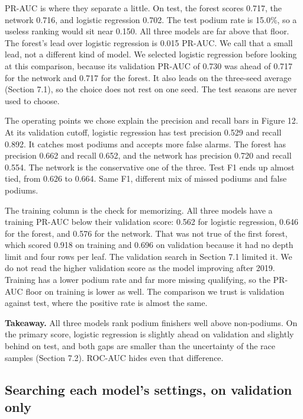 \documentclass[10pt,a4paper]{article}
\begin{document}
PR-AUC is where they separate a little. On test, the forest scores 0.717, the network 0.716, and logistic regression 0.702. The test podium rate is 15.0\%, so a useless ranking would sit near 0.150. All three models are far above that floor. The forest's lead over logistic regression is 0.015 PR-AUC. We call that a small lead, not a different kind of model. We selected logistic regression before looking at this comparison, because its validation PR-AUC of 0.730 was ahead of 0.717 for the network and 0.717 for the forest. It also leads on the three-seed average (Section 7.1), so the choice does not rest on one seed. The test seasons are never used to choose.


The operating points we chose explain the precision and recall bars in Figure 12. At its validation cutoff, logistic regression has test precision 0.529 and recall 0.892. It catches most podiums and accepts more false alarms. The forest has precision 0.662 and recall 0.652, and the network has precision 0.720 and recall 0.554. The network is the conservative one of the three. Test F1 ends up almost tied, from 0.626 to 0.664. Same F1, different mix of missed podiums and false podiums.


The training column is the check for memorizing. All three models have a training PR-AUC below their validation score: 0.562 for logistic regression, 0.646 for the forest, and 0.576 for the network. That was not true of the first forest, which scored 0.918 on training and 0.696 on validation because it had no depth limit and four rows per leaf. The validation search in Section 7.1 limited it. We do not read the higher validation score as the model improving after 2019. Training has a lower podium rate and far more missing qualifying, so the PR-AUC floor on training is lower as well. The comparison we trust is validation against test, where the positive rate is almost the same.


\begin{takeaway}
\textbf{Takeaway.} All three models rank podium finishers well above non-podiums. On the primary score, logistic regression is slightly ahead on validation and slightly behind on test, and both gaps are smaller than the uncertainty of the race samples (Section 7.2). ROC-AUC hides even that difference.
\end{takeaway}



\subsection{Searching each model's settings, on validation only}
\end{document}

